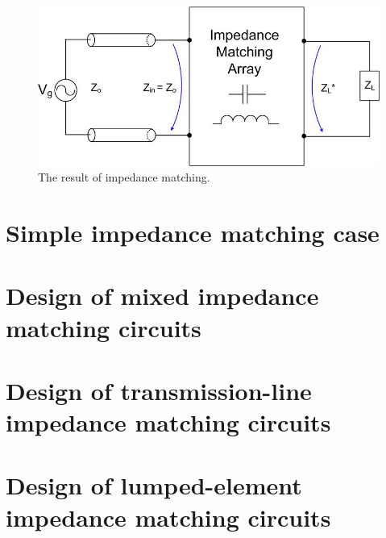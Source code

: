 \documentclass{ximera}
\begin{document}
\begin{figure}[htbp]
\begin{center}
\includegraphics[scale=0.5]{../jpg/Impedancematching.jpg}
\end{center}
\caption{The result of impedance matching.}
\label{impmatchgen}
\end{figure}




\section{Simple impedance matching case}

\section{Design of mixed impedance matching circuits}

\section{Design of transmission-line impedance matching circuits}


\section{Design of lumped-element impedance matching circuits}
\end{document}
